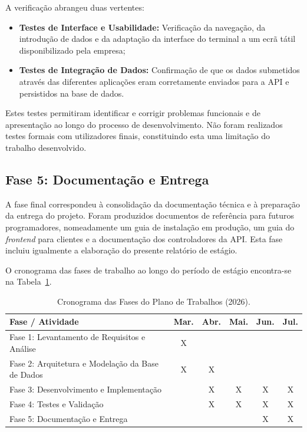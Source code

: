 A verificação abrangeu duas vertentes:
\begin{itemize}
    \item \textbf{Testes de Interface e Usabilidade:} Verificação da navegação, da introdução de dados e da adaptação da interface do terminal a um ecrã tátil disponibilizado pela empresa;
    \item \textbf{Testes de Integração de Dados:} Confirmação de que os dados submetidos através das diferentes aplicações eram corretamente enviados para a \ac{API} e persistidos na base de dados.
\end{itemize}

Estes testes permitiram identificar e corrigir problemas funcionais e de apresentação ao longo do processo de desenvolvimento. Não foram realizados testes formais com utilizadores finais, constituindo esta uma limitação do trabalho desenvolvido.


\subsection{Fase 5: Documentação e Entrega}

A fase final correspondeu à consolidação da documentação técnica e à preparação da entrega do projeto. Foram produzidos documentos de referência para futuros programadores, nomeadamente um guia de instalação em produção, um guia do \textit{frontend} para clientes e a documentação dos controladores da \ac{API}. Esta fase incluiu igualmente a elaboração do presente relatório de estágio.

\vspace{1em}
O cronograma das fases de trabalho ao longo do período de estágio encontra-se na Tabela~\ref{tab:cronograma}.

\begin{table}[H]
    \centering
    \caption{Cronograma das Fases do Plano de Trabalhos (2026).}
    \label{tab:cronograma}
    \begin{tabularx}{\textwidth}{|X|c|c|c|c|c|}
        \hline
        \rowcolor{gray!20} \textbf{Fase / Atividade} & \textbf{Mar.} & \textbf{Abr.} & \textbf{Mai.} & \textbf{Jun.} & \textbf{Jul.} \\ \hline
        Fase 1: Levantamento de Requisitos e Análise & \cellcolor{gray!50} X & & & & \\ \hline
        Fase 2: Arquitetura e Modelação da Base de Dados & \cellcolor{gray!50} X & \cellcolor{gray!50} X & & & \\ \hline
        Fase 3: Desenvolvimento e Implementação & & \cellcolor{gray!50} X & \cellcolor{gray!50} X & \cellcolor{gray!50} X & \cellcolor{gray!50} X \\ \hline
        Fase 4: Testes e Validação & & \cellcolor{gray!50} X & \cellcolor{gray!50} X & \cellcolor{gray!50} X & \cellcolor{gray!50} X \\ \hline
        Fase 5: Documentação e Entrega & & & & \cellcolor{gray!50} X & \cellcolor{gray!50} X \\ \hline
    \end{tabularx}
\end{table}